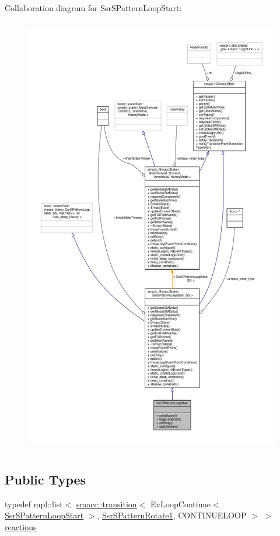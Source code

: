 Collaboration diagram for Ssr\+S\+Pattern\+Loop\+Start\+:
\nopagebreak
\begin{figure}[H]
\begin{center}
\leavevmode
\includegraphics[height=550pt]{structSsrSPatternLoopStart__coll__graph}
\end{center}
\end{figure}
\subsection*{Public Types}
\begin{DoxyCompactItemize}
\item 
typedef mpl\+::list$<$ \hyperlink{classsmacc_1_1transition}{smacc\+::transition}$<$ Ev\+Loop\+Continue$<$ \hyperlink{structSsrSPatternLoopStart}{Ssr\+S\+Pattern\+Loop\+Start} $>$, \hyperlink{structSsrSPatternRotate1}{Ssr\+S\+Pattern\+Rotate1}, C\+O\+N\+T\+I\+N\+U\+E\+L\+O\+OP $>$ $>$ \hyperlink{structSsrSPatternLoopStart_ac4859d7b58f82f99351f14a8ff7a26c3}{reactions}
\end{DoxyCompactItemize}
